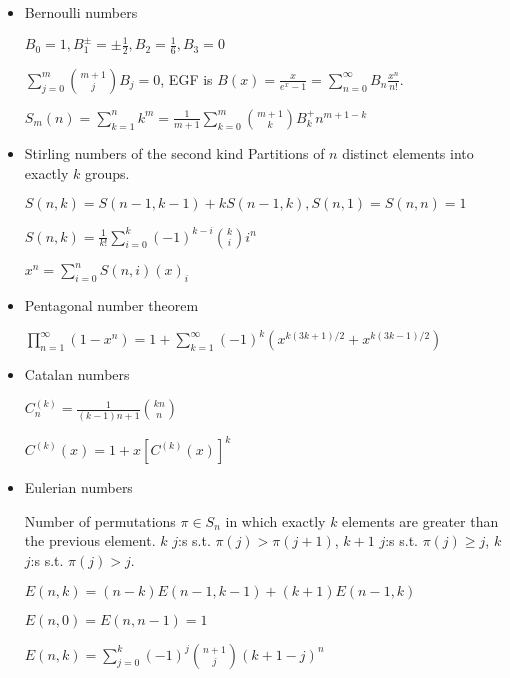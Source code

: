 \begin{itemize}
\item Bernoulli numbers

$B_0=1,B_1^{\pm}=\pm\frac{1}{2},B_2=\frac{1}{6},B_3=0$

$\displaystyle\sum_{j=0}^m\binom{m+1}{j}B_j=0$, EGF is $B(x) = \frac{x}{e^x - 1}=\displaystyle\sum_{n=0}^\infty B_n\frac{x^n}{n!}$.

$S_m(n)=\displaystyle\sum_{k=1}^nk^m=\frac{1}{m+1}\sum_{k=0}^m\binom{m+1}{k}B^{+}_kn^{m+1-k}$

\item Stirling numbers of the second kind
Partitions of $n$ distinct elements into exactly $k$ groups. 

$S(n, k) = S(n - 1, k - 1) + kS(n - 1, k), S(n, 1) = S(n, n) = 1$

$S(n, k) = \frac{1}{k!}\sum_{i=0}^{k}(-1)^{k-i}{k \choose i}i^n$

$x^n     = \sum_{i=0}^{n} S(n, i) (x)_i$

\item Pentagonal number theorem

$\displaystyle\prod_{n=1}^{\infty}(1-x^n)=1+\sum_{k=1}^{\infty}(-1)^k\left(x^{k(3k+1)/2} + x^{k(3k-1)/2}\right)$

\item Catalan numbers

$C^{(k)}_n = \displaystyle \frac{1}{(k - 1)n + 1}\binom{kn}{n}$

$C^{(k)}(x) = 1 + x [C^{(k)}(x)]^k$

\item Eulerian numbers

Number of permutations $\pi \in S_n$ in which exactly $k$ elements are greater than the previous element. $k$ $j$:s s.t. $\pi(j)>\pi(j+1)$, $k+1$ $j$:s s.t. $\pi(j)\geq j$, $k$ $j$:s s.t. $\pi(j)>j$.

$E(n,k) = (n-k)E(n-1,k-1) + (k+1)E(n-1,k)$

$E(n,0) = E(n,n-1) = 1$

$E(n,k) = \sum_{j=0}^k(-1)^j\binom{n+1}{j}(k+1-j)^n$

\end{itemize}
